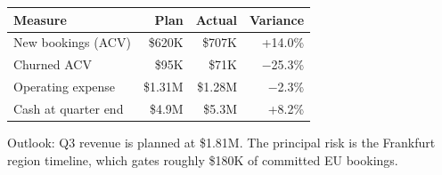 \documentclass[10pt]{article}
\begin{document}
\begin{tabularx}{\textwidth}{@{}Xrrr@{}}
  \toprule
  \rowcolor{white}
  {\bfseries Measure} & {\bfseries Plan} & {\bfseries Actual} & {\bfseries Variance}\\
  \midrule
  New bookings (ACV) & \$620K & \$707K & +14.0\%\\
  Churned ACV & \$95K & \$71K & $-$25.3\%\\
  Operating expense & \$1.31M & \$1.28M & $-$2.3\%\\
  Cash at quarter end & \$4.9M & \$5.3M & +8.2\%\\
  \bottomrule
\end{tabularx}

\vspace{4pt}
{\color{inkgray}\small Outlook: Q3 revenue is planned at \$1.81M. The
principal risk is the Frankfurt region timeline, which gates roughly
\$180K of committed EU bookings.}
\end{document}
